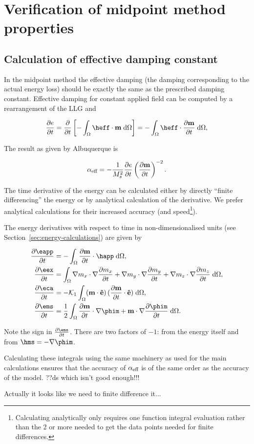 
\section{Verification of midpoint method properties}

\subsection{Calculation of effective damping constant}
\label{sec:exact-damp-const}

In the midpoint method the effective damping (\ie the damping corresponding to the actual energy loss) should be exactly the same as the prescribed damping constant.
Effective damping for constant applied field can be computed by a rearrangement of the LLG and

\begin{equation}
  \pd{e}{t} = \pd{}{t} \left[ - \int_\magd \heff \cdot \mv \d \magd \right] = - \int_\magd \heff \cdot \pd{\mv}{t} \d \magd,
\end{equation}

The result as given by Albuquerque \etal \cite{Albuquerque2001} is

\begin{equation}
  \alpha_\text{eff} = - \frac{1}{M_s^2} \frac{\partial e}{\partial t}  \left( \frac{\partial \mathbf{m}}{\partial t} \right)^{-2}.
\end{equation}


The time derivative of the energy can be calculated either by directly ``finite differencing'' the energy or by analytical calculation of the derivative.
We prefer analytical calculations for their increased accuracy (and speed\footnote{Calculating analytically only requires one function integral evaluation rather than the 2 or more needed to get the data points needed for finite differences.}).

The energy derivatives with respect to time in non-dimensionalised units (see Section~\ref{sec:energy-calculations}) are given by

\begin{align}
  \pd{\eapp}{t} &= - \int_\magd \pd{\mv}{t} \cdot \happ \d\magd, \\
  \pd{\eex}{t} &= \int_\magd \nabla m_x \cdot \nabla \pd{m_x}{t}
           + \nabla m_y \cdot \nabla \pd{m_y}{t}
           + \nabla m_z \cdot \nabla \pd{m_z}{t} \d\magd, \\
  \pd{\eca}{t} &= - \kone \int_\magd (\mv \cdot \ev )\, (\pd{\mv}{t} \cdot \ev) \d\magd, \\
  \pd{\ems}{t} &= \frac{1}{2} \int_\magd \pd{\mv}{t} \cdot \nabla \phim
       + \mv \cdot \nabla \pd{\phim}{t} \d\magd.
\end{align}

Note the sign in $\pd{\ems}{t}$. There are two factors of $-1$: from the energy itself and from $\hms = - \nabla \phim$.

Calculating these integrals using the same machinery as used for the main calculations ensures that the accuracy of $\alpha_\text{eff}$ is of the same order as the accuracy of the model. ??ds which isn't good enough!!!

Actually it looks like we need to finite difference it...

